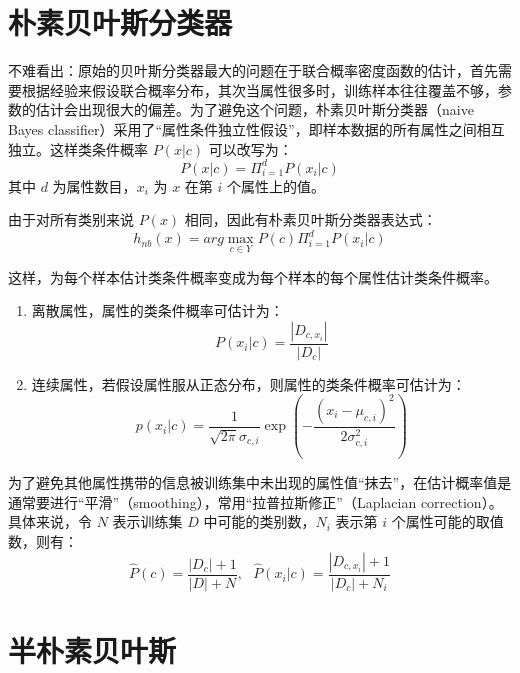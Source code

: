 \documentclass[12pt, a4paper]{article} %
\begin{document}
\section{朴素贝叶斯分类器}

不难看出：原始的贝叶斯分类器最大的问题在于联合概率密度函数的估计，首先需要根据经验来假设联合概率分布，其次当属性很多时，训练样本往往覆盖不够，参数的估计会出现很大的偏差。为了避免这个问题，朴素贝叶斯分类器（naive Bayes classifier）采用了“属性条件独立性假设”，即样本数据的所有属性之间相互独立。这样类条件概率 $P(x | c)$ 可以改写为：
\begin{equation*}
    P(x | c) = \Pi_{i = 1}^{d} P(x_i | c)
\end{equation*}
其中 $d$ 为属性数目，$x_i$ 为 $x$ 在第 $i$ 个属性上的值。

由于对所有类别来说 $P(x)$ 相同，因此有朴素贝叶斯分类器表达式：
\begin{equation*}
    h_{nb}(x) = arg \max_{c \in Y} P(c) \Pi_{i = 1}^{d} P(x_i | c)
\end{equation*}

这样，为每个样本估计类条件概率变成为每个样本的每个属性估计类条件概率。

\begin{enumerate}[\hspace*{2em} i.]
    \item 离散属性，属性的类条件概率可估计为：
    \begin{equation*}
        P(x_i | c) = \frac{|D_{c, x_i}|}{|D_c|}
    \end{equation*}
    \item 连续属性，若假设属性服从正态分布，则属性的类条件概率可估计为：
    \begin{equation*}
        p(x_i | c) = \frac{1}{\sqrt{2 \pi} \sigma_{c, i}} \exp (- \frac{(x_i - \mu_{c, i})^2}{2 \sigma_{c, i}^{2}})
    \end{equation*}
\end{enumerate}

为了避免其他属性携带的信息被训练集中未出现的属性值“抹去”，在估计概率值是通常要进行“平滑”（smoothing），常用“拉普拉斯修正”（Laplacian correction）。具体来说，令 $N$ 表示训练集 $D$ 中可能的类别数，$N_i$ 表示第 $i$ 个属性可能的取值数，则有：
\begin{equation*}
    \hat{P}(c) = \frac{|D_c| + 1}{|D| + N}, \ \ \ \hat{P}(x_i | c) = \frac{|D_{c, x_i}| + 1}{|D_c| + N_i}
\end{equation*}

\section{半朴素贝叶斯}
\end{document}
